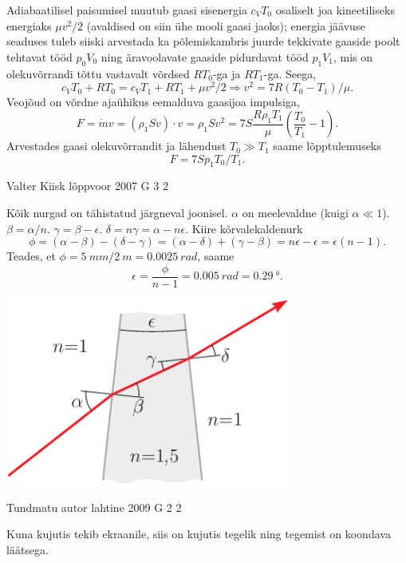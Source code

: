 \documentclass[11pt]{article}
\begin{document}
{{\ifSolution
Adiabaatilisel paisumisel muutub gaasi sisenergia $c_VT_0$ osaliselt joa kineetiliseks energiaks $\mu v^2/2$ (avaldised on siin ühe mooli gaasi jaoks); 
energia jäävuse seaduses tuleb siiski arvestada ka põlemiskambris juurde tekkivate gaaside poolt tehtavat tööd $p_0V_0$ ning
äravoolavate gaaside pidurdavat tööd $p_1V_1$, mis on olekuvõrrandi tõttu
vastavalt võrdsed $RT_0$-ga ja $RT_1$-ga. Seega, 
$$c_VT_0+RT_0=c_VT_1+RT_1+\mu v^2/2 \Rightarrow v^2=7R(T_0-T_1)/\mu.$$
Veojõud on võrdne ajaühikus eemalduva gaasijoa impulsiga,
$$F=\dot m v =(\rho_1 Sv)\cdot v=\rho_1 S v^2 = 7S\frac{R\rho_1T_1}{\mu}\left(\frac{T_0}{T_1}-1\right).$$
Arvestades gaasi olekuvõrrandit ja lähendust $T_0\gg T_1$ saame lõpptulemuseks
$$F=7Sp_1T_0/T_1.$$
\fi
}

{Valter Kiisk} %
{lõppvoor} %
{2007} %
{G 3} %
{2} %
{

\ifSolution
Kõik nurgad on tähistatud järgneval joonisel. $\alpha$ on meelevaldne (kuigi $\alpha \ll 1$). $\beta = \alpha /n$. $\gamma = \beta - \epsilon$. $\delta = n\gamma = \alpha - n\epsilon$. Kiire kõrvalekaldenurk
\[
\phi=(\alpha-\beta)-(\delta-\gamma)=(\alpha-\delta)+(\gamma-\beta)=n \epsilon-\epsilon=\epsilon(n-1).
\]
Teades, et $\phi = \SI{5}{mm}/\SI{2}{m} = \SI{0.0025}{rad}$, saame
\[
\epsilon=\frac{\phi}{n-1}=\SI{0,005}{rad}=\SI{0,29}{\degree}.
\]

\begin{center}
	\includegraphics[width=0.7\textwidth]{2007-v3g-03-yl}
\end{center}
\fi
}

{Tundmatu autor} %
{lahtine} %
{2009} %
{G 2} %
{2} %
{

\ifSolution
Kuna kujutis tekib ekraanile, siis on kujutis tegelik ning tegemist on koondava läätsega.

}}
\end{document}
